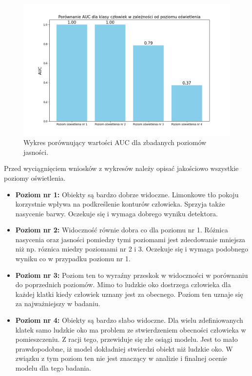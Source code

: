 \begin{figure}[H]
    \centering
    \includegraphics[width=\linewidth]{r_test_dokładności/AUC_charts/porownanieAUC.png}
    \caption{Wykres porównujący wartości AUC dla zbadanych poziomów jasności.}
    \label{fig:AUC}
\end{figure}

Przed wyciągnięciem wniosków z wykresów należy opisać jakościowo wszystkie poziomy oświetlenia. 
\begin{itemize}
    \item \textbf{Poziom nr 1:} Obiekty są bardzo dobrze widoczne. Limonkowe tło pokoju korzystnie wpływa na podkreślenie konturów człowieka. Sprzyja także nasycenie barwy. Oczekuje się i wymaga dobrego wyniku detektora. 
    \item \textbf{Poziom nr 2:} Widoczność równie dobra co dla poziomu nr 1. Różnica nasycenia oraz jasności pomiedzy tymi poziomami jest zdecdowanie mniejsza niż np. róznica miedzy poziomami nr 2 i 3. Oczekuje się i wymaga podobnego wyniku co w przypadku poziomu nr 1.
    \item \textbf{Poziom nr 3:} Poziom ten to wyraźny przeskok w widoczności w porównaniu do poprzednich poziomów. Mimo to ludzkie oko dostrzega człowieka dla każdej klatki kiedy człowiek uznany jest za obecnego. Poziom ten uznaje się za najważniejszy w badaniu.
    \item \textbf{Poziom nr 4:} Obiekty są bardzo słabo widoczne. Dla wielu zdefiniowanych klatek samo ludzkie oko ma problem ze stwierdzeniem obecności człowieka w pomieszczeniu. Z racji tego, przewiduje się złe osiągi modelu. Jest to mało prawdopodobne, iż model dokładniej stwierdzi obiekt niż ludzkie oko. W związku z tym poziom ten nie jest znaczący w analizie i finalnej ocenie modelu dla tego badania. 
\end{itemize}

